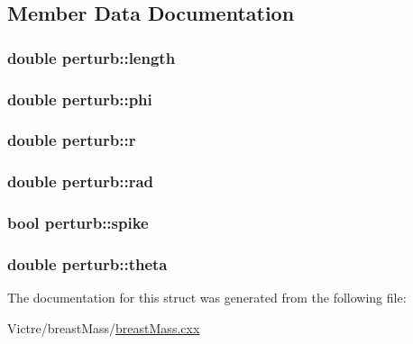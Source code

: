 \subsection{Member Data Documentation}
\hypertarget{structperturb_abccd94528853ef8c8c9fc3ef752cedb3}{
\subsubsection[{length}]{\setlength{\rightskip}{0pt plus 5cm}double perturb\-::length}}\label{structperturb_abccd94528853ef8c8c9fc3ef752cedb3}
\hypertarget{structperturb_a007934f3aee9bf27a197cf7b559dc088}{
\subsubsection[{phi}]{\setlength{\rightskip}{0pt plus 5cm}double perturb\-::phi}}\label{structperturb_a007934f3aee9bf27a197cf7b559dc088}
\hypertarget{structperturb_a17b885786a6640dd4e9ab2c728355c36}{
\subsubsection[{r}]{\setlength{\rightskip}{0pt plus 5cm}double perturb\-::r}}\label{structperturb_a17b885786a6640dd4e9ab2c728355c36}
\hypertarget{structperturb_a10479a25e619975429bac41bab42443f}{
\subsubsection[{rad}]{\setlength{\rightskip}{0pt plus 5cm}double perturb\-::rad}}\label{structperturb_a10479a25e619975429bac41bab42443f}
\hypertarget{structperturb_a862becc421371eb341ce62bec437c607}{
\subsubsection[{spike}]{\setlength{\rightskip}{0pt plus 5cm}bool perturb\-::spike}}\label{structperturb_a862becc421371eb341ce62bec437c607}
\hypertarget{structperturb_a550c35c8109b1abf38143d431b04422f}{
\subsubsection[{theta}]{\setlength{\rightskip}{0pt plus 5cm}double perturb\-::theta}}\label{structperturb_a550c35c8109b1abf38143d431b04422f}


The documentation for this struct was generated from the following file\-:\begin{DoxyCompactItemize}
\item 
Victre/breast\-Mass/\hyperlink{breastMass_8cxx}{breast\-Mass.\-cxx}\end{DoxyCompactItemize}
